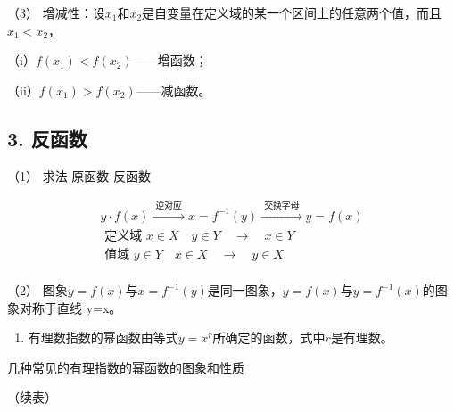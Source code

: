 （3）
增减性：设\(x_{1}\)和\(x_{2}\)是自变量在定义域的某一个区间上的任意两个值，而且\(x_{1} < x_{2}\)，

（i）\(f(x_{1}) < f(x_{2})\)------增函数；

（ii）\(f(x_{1}) > f(x_{2})\)------减函数。

\subsection{3. 反函数}

（1） 求法 原函数 反函数

\[
\begin{array}{l} y \cdot f (x) \xrightarrow {\text{ 逆对应 }} x = f^{- 1} (y) \xrightarrow {\text{ 交换字母 }} y = f (x) \\ \text{ 定义域 } x \in X \quad y \in Y \quad \longrightarrow \quad x \in Y \\ \text{ 值域 } y \in Y \quad x \in X \quad \longrightarrow \quad y \in X \\ \end{array}
\]

（2）
图象\(y = f(x)\)与\(x = f^{-1}(y)\)是同一图象，\(y=f(x)\)与\(y=f^{-1}(x)\)的图象对称于直线
y=x。

\begin{enumerate}[start=4]
\item
  有理数指数的幂函数由等式\(y = x^r\)所确定的函数，式中\(r\)是有理数。
\end{enumerate}

几种常见的有理指数的幂函数的图象和性质

{\centering
\small\setlength{\tabcolsep}{3pt}%
\par
}

（续表）

